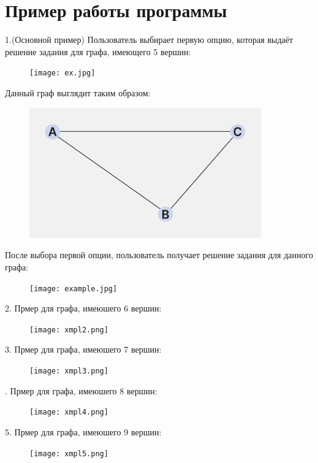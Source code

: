 \documentclass[14 pt]{article}
\begin{document}
\section{Пример работы программы}
\begin{пример}
1.(Основной пример) Пользователь выбирает первую опцию, которая выдаёт решение задания для графа, имеющего 5 вершин: 
\begin{figure}[H]
    \texttt{[image: ex.jpg]}
    \centering
    \end{figure}
\par
Данный граф выглядит таким образом:
\begin{figure}[H]
    \includegraphics[width=10cm]{graph.jpg}
    \centering
\end{figure}
\par
\newpage
После выбора первой опции, пользователь получает решение задания для данного графа:
\begin{figure}[H]
    \texttt{[image: example.jpg]}
    \centering
\end{figure}
\par
2. Прмер для графа, имеюшего 6 вершин:
\begin{figure}[H]
    \texttt{[image: xmpl2.png]}
    \centering
\end{figure}
\par
3. Прмер для графа, имеюшего 7 вершин:
\begin{figure}[H]
    \texttt{[image: xmpl3.png]}
    \centering
\end{figure}
\par
{}. Прмер для графа, имеюшего 8 вершин:
\begin{figure}[H]
    \texttt{[image: xmpl4.png]}
    \centering
\end{figure}
\par
5. Прмер для графа, имеюшего 9 вершин:
\begin{figure}[H]
    \texttt{[image: xmpl5.png]}
    \centering
\end{figure}
\par
\end{пример}
\newpage
\end{document}
